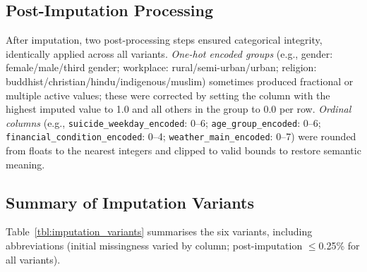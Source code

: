 \subsection{Post-Imputation Processing}

After imputation, two post-processing steps ensured categorical integrity, identically applied across all variants. \textit{One-hot encoded groups} (e.g., gender: female/male/third gender; workplace: rural/semi-urban/urban; religion: buddhist/christian/hindu/indigenous/muslim) sometimes produced fractional or multiple active values; these were corrected by setting the column with the highest imputed value to 1.0 and all others in the group to 0.0 per row. \textit{Ordinal columns} (e.g., \texttt{suicide\_weekday\_encoded}: 0--6; \texttt{age\_group\_encoded}: 0--6; \texttt{financial\_condition\_encoded}: 0--4; \texttt{weather\_main\_encoded}: 0--7) were rounded from floats to the nearest integers and clipped to valid bounds to restore semantic meaning.

\subsection{Summary of Imputation Variants}

Table~\ref{tbl:imputation_variants} summarises the six variants, including abbreviations (initial missingness varied by column; post-imputation $\leq$0.25\% for all variants).

